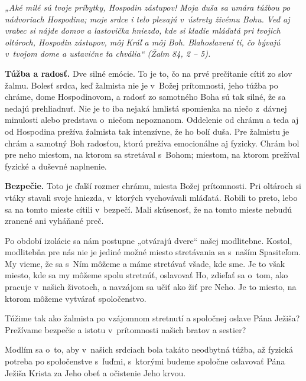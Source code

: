 


{\it „Aké milé sú tvoje príbytky, Hospodin zástupov! Moja duša sa umára túžbou po nádvoriach Hospodina; moje srdce i telo plesajú v~ústrety živému Bohu. Veď aj vrabec si nájde domov a lastovička hniezdo, kde si kladie mláďatá pri tvojich oltároch, Hospodin zástupov, môj Kráľ a môj Boh. Blahoslavení tí, čo bývajú v~tvojom dome a ustavične ťa chvália“ (Žalm 84, 2 -- 5).}

{\bf Túžba a radosť.} Dve silné emócie. To je to, čo na prvé prečítanie cítiť zo slov žalmu. Bolesť srdca, keď žalmista nie je v~Božej prítomnosti, jeho túžba po chráme, dome Hospodinovom, a radosť zo samotného Boha sú tak silné, že sa nedajú prehliadnuť. Nie je to iba nejaká hmlistá spomienka na niečo z~dávnej minulosti alebo predstava o~niečom nepoznanom. Oddelenie od chrámu a teda aj od Hospodina prežíva žalmista tak intenzívne, že ho bolí duša. Pre žalmistu je chrám a samotný Boh radosťou, ktorú prežíva emocionálne aj fyzicky. Chrám bol pre neho miestom, na ktorom sa stretával s~Bohom; miestom, na ktorom prežíval fyzické a duševné naplnenie.

{\bf Bezpečie.} Toto je ďalší rozmer chrámu, miesta Božej prítomnosti. Pri oltároch si vtáky stavali svoje hniezda, v~ktorých vychovávali mláďatá. Robili to preto, lebo sa na tomto mieste cítili v~bezpečí. Mali skúsenosť, že na tomto mieste nebudú zranené ani vyháňané preč.

Po období izolácie sa nám postupne „otvárajú dvere“ našej modlitebne. Kostol, modlitebňa pre nás nie je jediné možné miesto stretávania sa s~naším Spasiteľom. My vieme, že sa s~Ním môžeme a máme stretávať všade, kde sme. Je to však miesto, kde sa my môžeme spolu stretnúť, oslavovať Ho, zdieľať sa o~tom, ako pracuje v~našich životoch, a navzájom sa učiť ako žiť pre Neho. Je to miesto, na ktorom môžeme vytvárať spoločenstvo.

Túžime tak ako žalmista po vzájomnom stretnutí a spoločnej oslave Pána Ježiša? Prežívame bezpečie a istotu v~prítomnosti našich bratov a sestier?

Modlím sa o~to, aby v~našich srdciach bola takáto neodbytná túžba, až fyzická potreba po spoločenstve s~ľuďmi, s~ktorými budeme spoločne oslavovať Pána Ježiša Krista za Jeho obeť a očistenie Jeho krvou.


